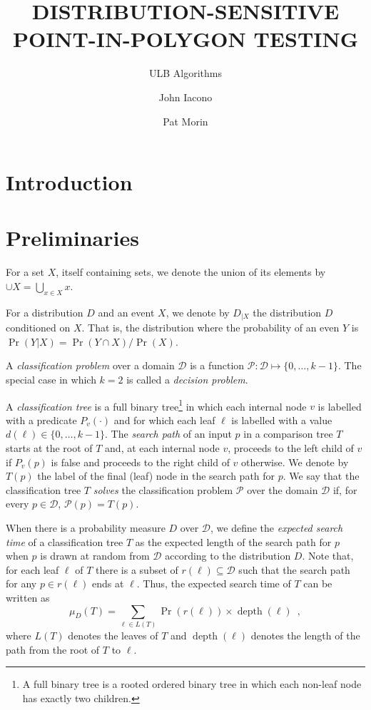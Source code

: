 \documentclass[charterfonts,lotsofwhite]{patmorin}
\title{\MakeUppercase{Distribution-Sensitive Point-in-Polygon Testing}}
\author{ULB Algorithms \and John Iacono \and Pat Morin}
\date{}
\DeclareMathOperator{\depth}{depth}
\begin{document}
\maketitle

\section{Introduction}


\section{Preliminaries}

For a set $X$, itself containing sets, we denote the union of its
elements by $\cup X=\bigcup_{x\in X} x$.

For a distribution $D$ and an event $X$, we denote by $D_{|X}$ the
distribution $D$ conditioned on $X$.  That is, the distribution where 
the probability of an even $Y$ is
$\Pr(Y|X)=\Pr(Y\cap X)/\Pr(X)$.

A \emph{classification problem} over a domain $\mathcal{D}$ is a function
$\mathcal{P}:\mathcal{D}\mapsto \{0,\ldots,k-1\}$.  The special case
in which $k=2$ is called a \emph{decision problem}.

A \emph{classification tree} is a full binary tree\footnote{A full
binary tree is a rooted ordered binary tree in which each non-leaf
node has exactly two children.} in which each internal node $v$ is
labelled with a predicate $P_v(\cdot)$ and for which each leaf $\ell$
is labelled with a value $d(\ell)\in\{0,\ldots,k-1\}$. The
\emph{search path} of an input $p$ in a comparison tree $T$ starts at
the root of $T$ and, at each internal node $v$, proceeds to the left
child of $v$ if $P_v(p)$ is false and proceeds to the right child of
$v$ otherwise.  We denote by $T(p)$ the label of the final (leaf) node
in the search path for $p$.  We say that the classification tree $T$
\emph{solves} the classification problem $\mathcal{P}$ over the domain
$\mathcal{D}$ if, for every $p\in \mathcal{D}$, $\mathcal{P}(p)=T(p)$.

When there is a probability measure $D$ over $\mathcal{D}$, we define
the \emph{expected search time} of a classification tree $T$ as the
expected length of the search path for $p$ when $p$ is drawn at random
from $\mathcal{D}$ according to the distribution $D$.  Note that, for
each leaf $\ell$ of $T$ there is a subset of $r(\ell)\subseteq
\mathcal{D}$ such that the search path for any $p\in r(\ell)$ ends at
$\ell$.  Thus, the expected search time of $T$ can be written as
\[
     \mu_D(T) = \sum_{\ell\in L(T)} \Pr(r(\ell))\times \depth(\ell)
	\enspace ,
\]
where $L(T)$ denotes the leaves of $T$ and $\depth(\ell)$ denotes the
length of the path from the root of $T$ to $\ell$.
\end{document}
